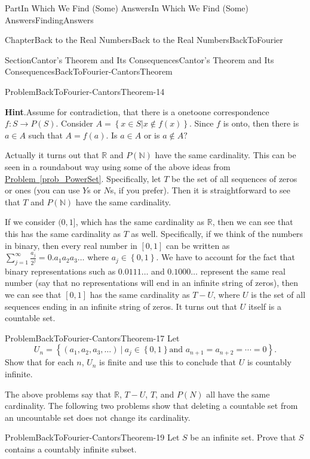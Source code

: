 \documentclass[oneside,10pt,]{book}
\newcommand{\blocktitlefont}{\relax}
\newcommand{\xreffont}{\relax}
\numberwithin{equation}{part}
\newcommand{\RR}{\mathbb {R}}
\newcommand{\NN}{\mathbb {N}}
\begin{document}
\begin{partptx}{Part}{In Which We Find (Some) Answers}{}{In Which We Find (Some) Answers}{}{}{FindingAnswers}
\begin{chapterptx}{Chapter}{Back to the Real Numbers}{}{Back to the Real Numbers}{}{}{BackToFourier}
\begin{sectionptx}{Section}{Cantor's Theorem and Its Consequences}{}{Cantor's Theorem and Its Consequences}{}{}{BackToFourier-CantorsTheorem}
\begin{problem}{Problem}{}{BackToFourier-CantorsTheorem-14}
\par\smallskip%
\noindent\textbf{\blocktitlefont Hint}.\hypertarget{BackToFourier-CantorsTheorem-14-3}{}\quad{}Assume for contradiction, that there is a one\textendash{}to\textendash{}one correspondence \(f:S\rightarrow P(S)\).  Consider \(A=\left\{x\in S|x\not\in f(x)\right\}\).  Since \(f\) is onto, then there is \(a\in A\) such that \(A=f(a)\).  Is \(a\in A\) or is \(a\not\in A?\)%
\end{problem}
Actually it turns out that \(\RR\) and \(P(\NN)\) have the same cardinality.  This can be seen in a roundabout way using some of the above ideas from \hyperref[prob_PowerSet]{Problem~{\xreffont\ref{prob_PowerSet}}}.  Specifically, let \(T\) be the set of all sequences of zeros or ones (you can use \(Y\)s or \(N\)s, if you prefer).  Then it is straightforward to see that \(T\) and \(P(\NN)\) have the same cardinality.%
\par
If we consider \((0,1]\), which has the same cardinality as \(\RR\), then we can see that this has the same cardinality as \(T\) as well.  Specifically, if we think of the numbers in binary, then every real number in \([0,1]\) can be written as \(\sum_{j=1}^\infty \frac{a_j}{2^j} =0.a_1a_2a_3\ldots\) where \(a_j\in\left\{0,1\right\}\).  We have to account for the fact that binary representations such as \(0.0111\ldots\) and \(0.1000\ldots\) represent the same real number (say that no representations will end in an infinite string of zeros), then we can see that \([0,1]\) has the same cardinality as \(T-U\), where \(U\) is the set of all sequences ending in an infinite string of zeros.  It turns out that \(U\) itself is a countable set.%
\begin{problem}{Problem}{}{BackToFourier-CantorsTheorem-17}%
 Let%
\begin{equation*}
U_n=\left\{(a_1,a_2,a_3,\ldots)\ |\ a_j\in \left\{0,1\right\} \text{
and } a_{n+1}=a_{n+2}=\cdots=0\right\}\text{.}
\end{equation*}
Show that for each \(n\), \(U_n\) is finite and use this to conclude that \(U\) is countably infinite.%
\end{problem}
The above problems say that \(\RR\), \(T-U\), \(T\), and \(P(N)\) all have the same cardinality.  The following two problems show that deleting a countable set from an uncountable set does not change its cardinality.%
\begin{problem}{Problem}{}{BackToFourier-CantorsTheorem-19}%
 Let \(S\) be an infinite set.  Prove that \(S\) contains a countably infinite subset.%

\end{problem}
\end{sectionptx}
\end{chapterptx}
\end{partptx}
\end{document}
